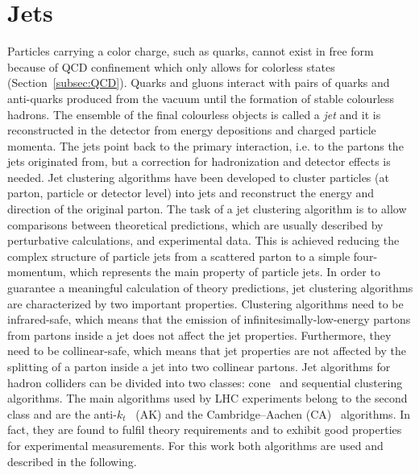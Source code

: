\section{Jets}\label{sec:jets}

Particles carrying a color charge, such as quarks, cannot exist in free form because of QCD confinement which only allows for colorless states (Section~\ref{subsec:QCD}). Quarks and gluons interact with pairs of quarks and anti-quarks produced from the vacuum until the formation of stable colourless hadrons. The ensemble of the final colourless objects is called a \textit{jet} and it is reconstructed in the detector from energy depositions and charged particle momenta.
The jets point back to the primary interaction, i.e. to the partons the jets originated from, but a correction for hadronization and detector effects is needed. Jet clustering algorithms have been developed to cluster particles (at parton, particle or detector level) into jets and reconstruct the energy and direction of the original parton. The task of a jet clustering algorithm is to allow comparisons between theoretical predictions, which are usually described by perturbative calculations, and experimental data. This is achieved reducing the complex structure of particle jets from a scattered parton to a simple four-momentum, which represents the main property of particle jets.
In order to guarantee a meaningful calculation of theory predictions, jet clustering algorithms are characterized by two important properties.
Clustering algorithms need to be infrared-safe, which means that the emission of infinitesimally-low-energy partons from partons inside a jet does not affect the jet properties. Furthermore, they need to be collinear-safe, which means that jet properties are not affected by the splitting of a parton inside a jet into two collinear partons.
Jet algorithms for hadron colliders can be divided into two classes: cone~\cite{Salam:2007xv} and sequential clustering~\cite{Catani:1993hr,Ellis:1993tq,Dokshitzer:1997in,Wobisch:1998wt,Cacciari:2008gp} algorithms.
The main algorithms used by LHC experiments belong to the second class and are the anti-$k_t$~\cite{Cacciari:2008gp} (AK) and the Cambridge--Aachen (CA)~\cite{Catani:1993hr,Dokshitzer:1997in} algorithms. In fact, they are found to fulfil theory requirements and to exhibit good properties for experimental measurements. For this work both algorithms are used and described in the following.
 
